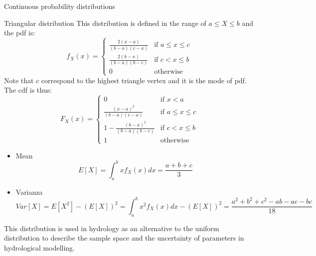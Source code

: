 \documentclass[8pt]{beamer}
\renewcommand{\emph}[1]{\textcolor{myorange}{#1}}
\begin{document}
\begin{frame}{Continuous probability distributions} %
    \begin{block}{\alert{Triangular} distribution}
        This distribution is defined in the range of $a \leq X \leq b$ and the \emph{pdf} is:
\[
f_X (x) =
\begin{cases}
    \frac{2(x-a)}{(b-a)(c-a)} & \text{if } a \leq x \leq c \\
    \frac{2(b-x)}{(b-a)(b-c)} & \text{if } c < x \leq b \\
    0 & \text{otherwise }
\end{cases}
\]
Note that $c$ correspond to the highest triangle vertex and it is the mode of \emph{pdf}. The \emph{cdf} is thus:
\[
F_X (x) =
\begin{cases}
    0 & \text{if } x < a \\
    \frac{(x-a)^2}{(b-a)(c-a)} & \text{if } a \leq x \leq c \\
    1-\frac{(b-x)^2}{(b-a)(b-c)} & \text{if } c < x \leq b \\
    1 & \text{otherwise }
\end{cases}
\]
\begin{itemize}
    \item \emph{Mean}
                \vspace{-5pt}
        \[
            E[X] = \int_a^b x f_X(x) dx = \frac{a+b+c}{3}
        \]
    \item \emph{Varianza}
                \vspace{-5pt}
        \[
            Var[X] = E[X^2] - \left( E[X] \right)^2 = \int_a^b x^2 f_X(x) dx - \left( E[X] \right)^2 = \frac{a^2 + b^2 + c^2 -ab-ac-bc}{18}
    \]
\end{itemize}
This distribution is used in hydrology as an alternative to the \alert{uniform distribution} to describe the sample space and the uncertainty of parameters in hydrological modelling. 

    \end{block}
\end{frame}
\end{document}
